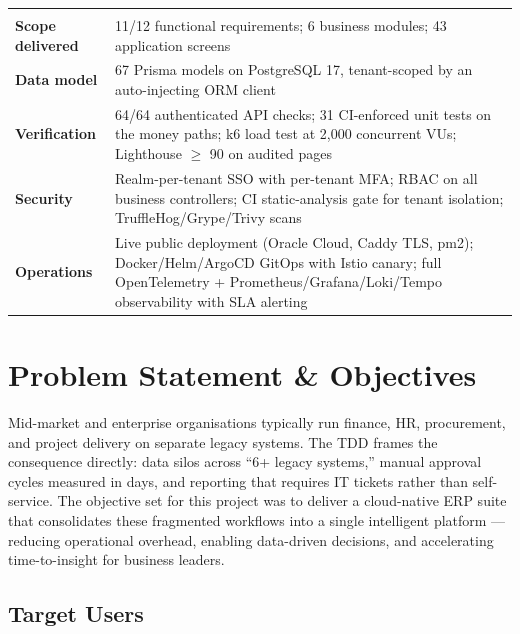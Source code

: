 \documentclass[11pt,a4paper]{article}
\begin{document}
\begin{table}[H]
\centering\small
\renewcommand{\arraystretch}{1.35}
\begin{tabularx}{\textwidth}{l X}
\toprule
\rowcolor{amdoxnavy} \multicolumn{2}{l}{\color{white}\textbf{Project at a Glance}} \\
\textbf{Scope delivered}   & 11/12 functional requirements; 6 business modules; 43 application screens \\
\rowcolor{amdoxlight}
\textbf{Data model}        & 67 Prisma models on PostgreSQL 17, tenant-scoped by an auto-injecting ORM client \\
\textbf{Verification}      & 64/64 authenticated API checks; 31 CI-enforced unit tests on the money paths; k6 load test at 2{,}000 concurrent VUs; Lighthouse $\geq$ 90 on audited pages \\
\rowcolor{amdoxlight}
\textbf{Security}          & Realm-per-tenant SSO with per-tenant MFA; RBAC on all business controllers; CI static-analysis gate for tenant isolation; TruffleHog/Grype/Trivy scans \\
\textbf{Operations}        & Live public deployment (Oracle Cloud, Caddy TLS, pm2); Docker/Helm/ArgoCD GitOps with Istio canary; full OpenTelemetry + Prometheus/Grafana/Loki/Tempo observability with SLA alerting \\
\bottomrule
\end{tabularx}
\end{table}

\section{Problem Statement \& Objectives}

Mid-market and enterprise organisations typically run finance, HR, procurement, and
project delivery on separate legacy systems. The TDD frames the consequence directly:
data silos across ``6+ legacy systems,'' manual approval cycles measured in days,
and reporting that requires IT tickets rather than self-service. The objective set for
this project was to deliver a cloud-native ERP suite that consolidates these fragmented
workflows into a single intelligent platform --- reducing operational overhead, enabling
data-driven decisions, and accelerating time-to-insight for business leaders.

\subsection{Target Users}
\end{document}
